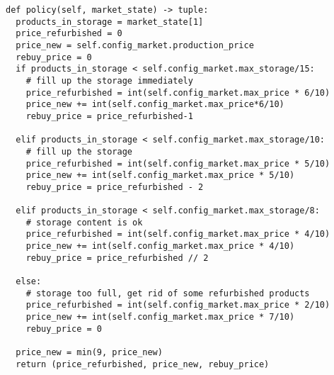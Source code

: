 \newpage

\lstset{language=Python}
\lstset{frame=lines}
\lstset{basicstyle=\footnotesize}
\begin{lstlisting}
def policy(self, market_state) -> tuple:
  products_in_storage = market_state[1]
  price_refurbished = 0
  price_new = self.config_market.production_price
  rebuy_price = 0
  if products_in_storage < self.config_market.max_storage/15:
    # fill up the storage immediately
    price_refurbished = int(self.config_market.max_price * 6/10)
    price_new += int(self.config_market.max_price*6/10)
    rebuy_price = price_refurbished-1

  elif products_in_storage < self.config_market.max_storage/10:
    # fill up the storage
    price_refurbished = int(self.config_market.max_price * 5/10)
    price_new += int(self.config_market.max_price * 5/10)
    rebuy_price = price_refurbished - 2

  elif products_in_storage < self.config_market.max_storage/8:
    # storage content is ok
    price_refurbished = int(self.config_market.max_price * 4/10)
    price_new += int(self.config_market.max_price * 4/10)
    rebuy_price = price_refurbished // 2

  else:
    # storage too full, get rid of some refurbished products
    price_refurbished = int(self.config_market.max_price * 2/10)
    price_new += int(self.config_market.max_price * 7/10)
    rebuy_price = 0

  price_new = min(9, price_new)
  return (price_refurbished, price_new, rebuy_price)
\end{lstlisting}